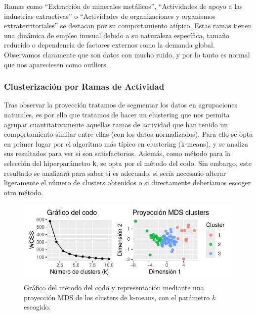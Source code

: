 \documentclass[Universitat de
València,article,submit,moreauthors,pdftex]{Definitions/mdpi}
\begin{document}
Ramas como ``Extracción de minerales metálicos'', ``Actividades de apoyo
a las industrias extractivas'' o ``Actividades de organizaciones y
organismos extraterritoriales'' se destacan por su comportamiento
atípico. Estas ramas tienen una dinámica de empleo inusual debido a su
naturaleza específica, tamaño reducido o dependencia de factores
externos como la demanda global. Observamos claramente que son datos con
mucho ruido, y por lo tanto es normal que nos apareciesen como outliers.

\subsubsection{\texorpdfstring{\textbf{Clusterización por Ramas de
Actividad}}{Clusterización por Ramas de Actividad}}\label{clusterizaciuxf3n-por-ramas-de-actividad}

Tras observar la proyección tratamos de segmentar los datos en
agrupaciones naturales, es por ello que tratamos de hacer un clustering
que nos permita agrupar cuantitativamente aquellas ramas de actividad
que han tenido un comportamiento similar entre ellas (con los datos
normalizados). Para ello se opta en primer lugar por el algoritmo más
típico en clustering (k-means), y se analiza sus resultados para ver si
son satisfactorios. Además, como método para la selección del
hiperparámetro \texttt{k}, se opta por el método del codo. Sin embargo,
este resultado se analizará para saber si es adecuado, si sería
necesario alterar ligeramente el número de clusters obtenidos o si
directamente deberíamos escoger otro método.

\begin{figure}

{\centering \includegraphics{ProyectoAED2024_files/figure-latex/unnamed-chunk-45-1} 

}

\caption{Gráfico del método del codo y representación mediante una proyección MDS de los clusters de k-means, con el parámetro $k$ escogido.}\label{fig:unnamed-chunk-45}
\end{figure}
\end{document}
